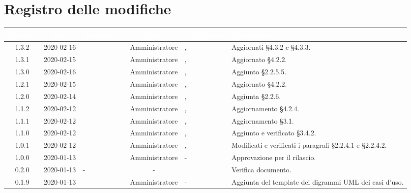 \section*{Registro delle modifiche}
{
\renewcommand{\arraystretch}{1.5}
\centering
\begin{longtable}{ c c  C{2.5cm} c C{3cm} C{3.5cm}}
\textcolor{white}{\textbf{Versione}}&
\textcolor{white}{\textbf{Data}}&
\textcolor{white}{\textbf{Nominativo}}&
\textcolor{white}{\textbf{Ruolo}}&
\textcolor{white}{\textbf{Verificatore}}&
\textcolor{white}{\textbf{Descrizione}}\\	
\endhead

1.3.2 & 2020-02-16 & \SE{} & Amministratore & \CE{}, \MC{} & Aggiornati §4.3.2 e §4.3.3. \\

1.3.1 & 2020-02-15 & \SE{} & Amministratore & \CE{}, \MC{} & Aggiornato §4.2.2. \\

1.3.0 & 2020-02-16 & \SE{} & Amministratore & \CE{}, \MC{} & Aggiunto §2.2.5.5. \\

1.2.1 & 2020-02-15 & \SE{} & Amministratore & \CE{}, \MC{} & Aggiornato §4.2.2. \\

1.2.0 & 2020-02-14 & \SE{} & Amministratore & \CE{}, \MC{} & Aggiunta §2.2.6. \\

1.1.2 & 2020-02-12 & \SE{} & Amministratore & \CE{}, \MC{} & Aggiornamento §4.2.4. \\ 

1.1.1 & 2020-02-12 & \BR{} & Amministratore & \CE{}, \MC{} & Aggiornamento §3.1. \\ 

1.1.0 & 2020-02-12 & \BR{} & Amministratore & \CE{}, \MC{} & Aggiunto e verificato §3.4.2. \\

1.0.1 & 2020-02-12 & \SE{} & Amministratore & \CE{}, \MC{} & Modificati e verificati i paragrafi §2.2.4.1 e §2.2.4.2. \\ 

1.0.0 & 2020-01-13 & \AT{} & Amministratore & - & Approvazione per il rilascio.  \\

0.2.0 & 2020-01-13 & - & - & \PF{} & Verifica documento.  \\ 

0.1.9 & 2020-01-13 & \CE{} & Amministratore & - & Aggiunta del template dei digrammi UML dei casi d'uso. \\


\end{longtable}}
